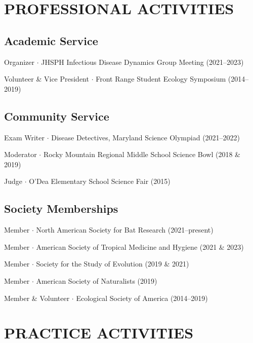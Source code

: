 \documentclass{cv}
\begin{document}
\section*{PROFESSIONAL ACTIVITIES}

\subsection*{Academic Service}

Organizer $\cdot$ JHSPH Infectious Disease Dynamics Group Meeting (2021--2023)

Volunteer \& Vice President $\cdot$ Front Range Student Ecology Symposium (2014--2019)

\subsection*{Community Service}

Exam Writer $\cdot$ Disease Detectives, Maryland Science Olympiad (2021--2022)

Moderator $\cdot$ Rocky Mountain Regional Middle School Science Bowl (2018 \& 2019)

Judge $\cdot$ O'Dea Elementary School Science Fair (2015)

\subsection*{Society Memberships}

Member $\cdot$ North American Society for Bat Research (2021--present)

Member $\cdot$ American Society of Tropical Medicine and Hygiene (2021 \& 2023)

Member $\cdot$ Society for the Study of Evolution (2019 \& 2021)

Member $\cdot$ American Society of Naturalists (2019)

Member \& Volunteer $\cdot$ Ecological Society of America (2014--2019)


\section*{PRACTICE ACTIVITIES}

\end{document}
